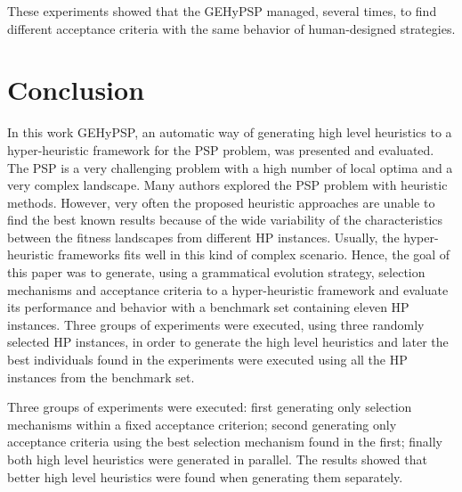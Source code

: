 \documentclass[conference]{IEEEtran}
\begin{document}
These experiments showed that the GEHyPSP managed, several times, to find different acceptance criteria with the same behavior of human-designed strategies. 





%
%
%


\section{Conclusion}
\label{sec:conclusion}
In this work  GEHyPSP, an automatic way of generating high level heuristics to a hyper-heuristic framework for the PSP problem, was presented and evaluated. The PSP is a very challenging problem  with a high number of local optima and a very complex landscape. Many authors explored the PSP problem with heuristic methods. 
However, very often the proposed heuristic approaches are unable to find the best known results because of the wide variability of the characteristics between the fitness landscapes from different HP instances. Usually, the hyper-heuristic frameworks fits well in this kind of complex scenario. Hence, the goal of this paper was to generate, using a grammatical evolution strategy, selection mechanisms and acceptance criteria to a hyper-heuristic framework and evaluate its performance and behavior with a benchmark set containing eleven HP instances. Three groups of experiments were executed, using three randomly selected HP instances, in order to generate the high level heuristics and later the best individuals found in the experiments were executed using all the HP instances from the benchmark set. 

Three groups of experiments were executed: first generating only selection mechanisms within a fixed acceptance criterion; second generating only acceptance criteria using the best selection mechanism found in the first; finally both high level heuristics were generated in parallel. The results showed that better high level heuristics were found when generating them separately. 
\end{document}
